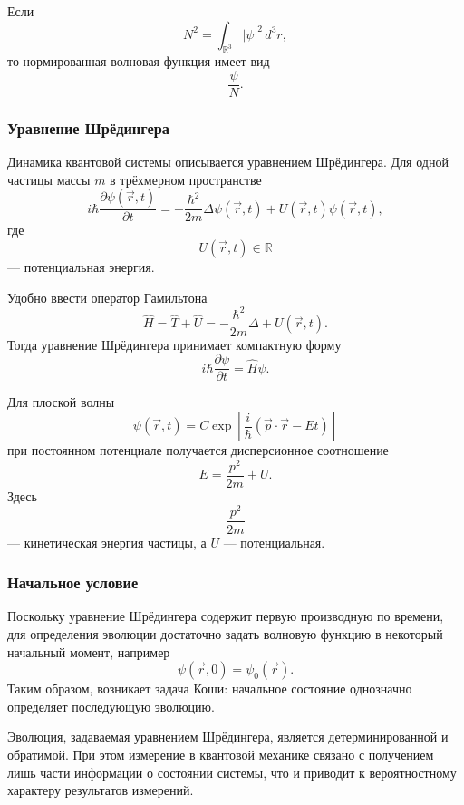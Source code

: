 \documentclass[12pt,a4paper]{article}
\begin{document}
Если
\[
    N^2
    =
    \int_{\mathbb R^3}
        |\psi|^2\,d^3r,
\]
то нормированная волновая функция имеет вид
\[
    \frac{\psi}{N}.
\]


\subsubsection{Уравнение Шрёдингера}

Динамика квантовой системы описывается уравнением Шрёдингера.
Для одной частицы массы $m$ в трёхмерном пространстве
\[
    \boxed{
    i\hbar
    \frac{\partial\psi(\vec r,t)}{\partial t}
    =
    -\frac{\hbar^2}{2m}
    \Delta\psi(\vec r,t)
    +
    U(\vec r,t)\psi(\vec r,t)
    },
\]
где
\[
    U(\vec r,t)\in\mathbb R
\]
--- потенциальная энергия.

Удобно ввести оператор Гамильтона
\[
    \boxed{
        \hat H
        =
        \hat T+\hat U
        =
        -\frac{\hbar^2}{2m}\Delta
        +
        U(\vec r,t)
    }.
\]
Тогда уравнение Шрёдингера принимает компактную форму
\[
    \boxed{
        i\hbar\frac{\partial\psi}{\partial t}
        =
        \hat H\psi
    }.
\]

Для плоской волны
\[
    \psi(\vec r,t)
    =
    C
    \exp\left[
        \frac{i}{\hbar}
        \left(
            \vec p\cdot\vec r-Et
        \right)
    \right]
\]
при постоянном потенциале получается дисперсионное соотношение
\[
    \boxed{
        E
        =
        \frac{p^2}{2m}
        +
        U
    }.
\]
Здесь
\[
    \frac{p^2}{2m}
\]
--- кинетическая энергия частицы, а $U$ --- потенциальная.

\subsubsection{Начальное условие}

Поскольку уравнение Шрёдингера содержит первую производную по времени,
для определения эволюции достаточно задать волновую функцию в некоторый
начальный момент, например
\[
    \boxed{
        \psi(\vec r,0)
        =
        \psi_0(\vec r)
    }.
\]
Таким образом, возникает задача Коши: начальное состояние однозначно
определяет последующую эволюцию.

Эволюция, задаваемая уравнением Шрёдингера, является
детерминированной и обратимой. При этом измерение в квантовой механике
связано с получением лишь части информации о состоянии системы, что и
приводит к вероятностному характеру результатов измерений.
\end{document}
